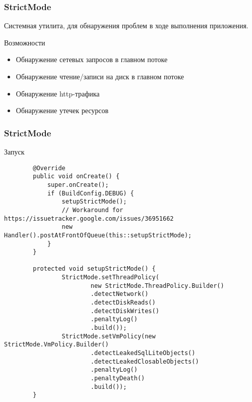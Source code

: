 \documentclass{beamer}
\begin{document}
\begin{frame}
    \frametitle{StrictMode}
    Системная утилита, для обнаружения проблем в ходе выполнения приложения.
    \begin{block}{Возможности}
        \begin{itemize}
            \item{Обнаружение сетевых запросов в главном потоке}
            \item{Обнаружение чтение/записи на диск в главном потоке}
            \item{Обнаружение http-трафика}
            \item{Обнаружение утечек ресурсов}
        \end{itemize}
    \end{block}
\end{frame}

\begin{frame}[fragile]
    \frametitle{StrictMode}
    \begin{block}{Запуск}
        \begin{verbatim}
        @Override
        public void onCreate() {
            super.onCreate();
            if (BuildConfig.DEBUG) {
                setupStrictMode();
                // Workaround for https://issuetracker.google.com/issues/36951662
                new Handler().postAtFrontOfQueue(this::setupStrictMode);
            }
        }

        protected void setupStrictMode() {
                StrictMode.setThreadPolicy(
                        new StrictMode.ThreadPolicy.Builder()
                        .detectNetwork()
                        .detectDiskReads()
                        .detectDiskWrites()
                        .penaltyLog()
                        .build());
                StrictMode.setVmPolicy(new StrictMode.VmPolicy.Builder()
                        .detectLeakedSqlLiteObjects()
                        .detectLeakedClosableObjects()
                        .penaltyLog()
                        .penaltyDeath()
                        .build());
        }
        \end{verbatim}
    \end{block}
\end{frame}
\end{document}
